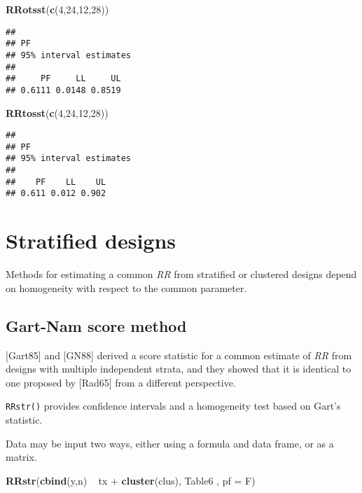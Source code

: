 \documentclass[]{article}
\newenvironment{Shaded}{\begin{snugshade}}{\end{snugshade}}
\newcommand{\KeywordTok}[1]{\textcolor[rgb]{0.13,0.29,0.53}{\textbf{{#1}}}}
\newcommand{\DataTypeTok}[1]{\textcolor[rgb]{0.13,0.29,0.53}{{#1}}}
\newcommand{\DecValTok}[1]{\textcolor[rgb]{0.00,0.00,0.81}{{#1}}}
\newcommand{\StringTok}[1]{\textcolor[rgb]{0.31,0.60,0.02}{{#1}}}
\newcommand{\NormalTok}[1]{{#1}}
\begin{document}
\begin{Shaded}
\begin{Highlighting}[]
\KeywordTok{RRotsst}\NormalTok{(}\KeywordTok{c}\NormalTok{(}\DecValTok{4}\NormalTok{,}\DecValTok{24}\NormalTok{,}\DecValTok{12}\NormalTok{,}\DecValTok{28}\NormalTok{))}
\end{Highlighting}
\end{Shaded}

\begin{verbatim}
## 
## PF 
## 95% interval estimates
## 
##     PF     LL     UL 
## 0.6111 0.0148 0.8519
\end{verbatim}

\begin{Shaded}
\begin{Highlighting}[]
\KeywordTok{RRtosst}\NormalTok{(}\KeywordTok{c}\NormalTok{(}\DecValTok{4}\NormalTok{,}\DecValTok{24}\NormalTok{,}\DecValTok{12}\NormalTok{,}\DecValTok{28}\NormalTok{))}
\end{Highlighting}
\end{Shaded}

\begin{verbatim}
## 
## PF 
## 95% interval estimates
## 
##    PF    LL    UL 
## 0.611 0.012 0.902
\end{verbatim}

\section{Stratified designs}

Methods for estimating a common \emph{RR} from stratified or clustered
designs depend on homogeneity with respect to the common parameter.

\subsection{Gart-Nam score method \label{sec:gart}}

{[}Gart85{]} and {[}GN88{]} derived a score statistic for a common
estimate of \emph{RR} from designs with multiple independent strata, and
they showed that it is identical to one proposed by {[}Rad65{]} from a
different perspective.

\texttt{RRstr()} provides confidence intervals and a homogeneity test
based on Gart's statistic.

Data may be input two ways, either using a formula and data frame, or as
a matrix.

\begin{Shaded}
\begin{Highlighting}[]
\KeywordTok{RRstr}\NormalTok{(}\KeywordTok{cbind}\NormalTok{(y,n) ~}\StringTok{ }\NormalTok{tx +}\StringTok{ }\KeywordTok{cluster}\NormalTok{(clus), Table6 , }\DataTypeTok{pf =} \NormalTok{F)}
\end{Highlighting}
\end{Shaded}
\end{document}
